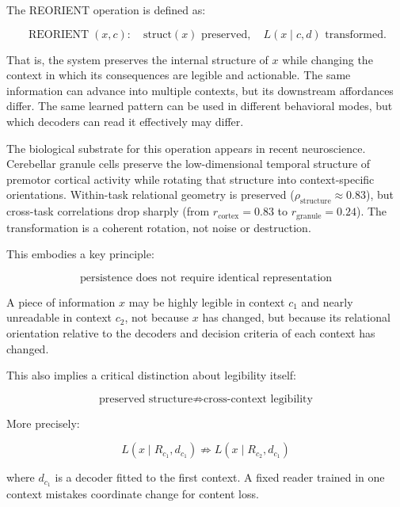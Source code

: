 \documentclass[12pt]{article}
\begin{document}
The REORIENT operation is defined as:

\begin{equation}
\operatorname{REORIENT}(x, c): \quad \text{struct}(x) \text{ preserved}, \quad L(x \mid c, d) \text{ transformed}.
\end{equation}

That is, the system preserves the internal structure of $x$ while changing the context in which its consequences are legible and actionable. The same information can advance into multiple contexts, but its downstream affordances differ. The same learned pattern can be used in different behavioral modes, but which decoders can read it effectively may differ.

The biological substrate for this operation appears in recent neuroscience. Cerebellar granule cells preserve the low-dimensional temporal structure of premotor cortical activity while rotating that structure into context-specific orientations. Within-task relational geometry is preserved ($\rho_{\text{structure}} \approx 0.83$), but cross-task correlations drop sharply (from $r_{\text{cortex}} = 0.83$ to $r_{\text{granule}} = 0.24$). The transformation is a coherent rotation, not noise or destruction.

This embodies a key principle:

\begin{equation}
\boxed{\text{persistence does not require identical representation}}
\end{equation}

A piece of information $x$ may be highly legible in context $c_1$ and nearly unreadable in context $c_2$, not because $x$ has changed, but because its relational orientation relative to the decoders and decision criteria of each context has changed.

This also implies a critical distinction about legibility itself:

\begin{equation}
\boxed{\text{preserved structure} \not\Rightarrow \text{cross-context legibility}}
\end{equation}

More precisely:

\begin{equation}
L(x \mid R_{c_1}, d_{c_1}) \not\Rightarrow L(x \mid R_{c_2}, d_{c_1})
\end{equation}

where $d_{c_1}$ is a decoder fitted to the first context. A fixed reader trained in one context mistakes coordinate change for content loss.
\end{document}
